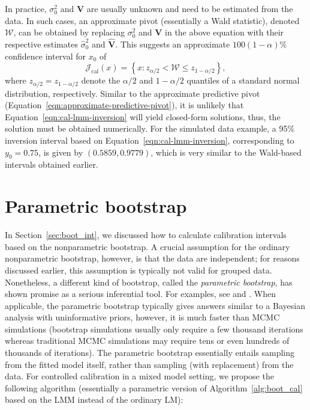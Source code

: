 \documentclass[cmfont,usenames,dvipsnames,leqno]{afit-etd}\usepackage[]{graphicx}\usepackage[]{color}
\newcommand{\mc}[1]{\ensuremath{\mathcal{#1}}}
\newcommand{\wh}[1]{\ensuremath{\widehat{#1}}}
\begin{document}
In practice, $\sigma_0^2$ and $\bm{V}$ are usually unknown and need to be estimated from the data. In such cases, an approximate pivot (essentially a Wald statistic), denoted $\mc{W}$, can be obtained by replacing $\sigma_0^2$ and $\bm{V}$ in the above equation with their respective estimates $\wh{\sigma}_0^2$ and $\wh{\bm{V}}$. This suggests an approximate $100(1-\alpha)\%$ confidence interval for $x_0$ of
\begin{equation}
\label{eqn:cal-lmm-inversion}
  \mc{J}_\mathrm{cal}(x) = \left\{ x: z_{\alpha/2} < \mc{W} \le z_{1-\alpha/2} \right\},
\end{equation}
where $z_{\alpha/2} = z_{1-\alpha/2}$ denote the $\alpha/2$ and $1 - \alpha/2$ quantiles of a standard normal distribution, respectively. Similar to the approximate predictive pivot (Equation~\eqref{eqn:approximate-predictive-pivot}), it is unlikely that Equation~\eqref{eqn:cal-lmm-inversion} will yield closed-form solutions, thus, the solution must be obtained numerically. For the simulated data example, a 95\% inversion interval based on Equation~\eqref{eqn:cal-lmm-inversion}, corresponding to $y_0 = 0.75$, is given by $(0.5859, 0.9779)$, which is very similar to the Wald-based intervals obtained earlier.

\section{Parametric bootstrap}
\label{sec:calibration-lmm-parboot}
In Section~\ref{sec:boot_int}, we discussed how to calculate calibration intervals based on the nonparametric bootstrap. A crucial assumption for the ordinary nonparametric bootstrap, however, is that the data are independent; for reasons discussed earlier, this assumption is typically not valid for grouped data. Nonetheless, a different kind of bootstrap, called the \textit{parametric bootstrap}, has shown promise as a serious inferential tool. For examples, see \citet[pg. 342]{mcculloch_generalized_2008} and \citet{efron_bootstrap_2011}. When applicable, the parametric bootstrap typically gives answers similar to a Bayesian analysis with uninformative priors, however, it is much faster than MCMC simulations (bootstrap simulations usually only require a few thousand iterations whereas traditional MCMC simulations may require tens or even hundreds of thousands of iterations). The parametric bootstrap essentially entails sampling from the fitted model itself, rather than sampling (with replacement) from the data. For controlled calibration in a mixed model setting, we propose the following algorithm (essentially a parametric version of Algorithm~\ref{alg:boot_cal} based on the LMM instead of the ordinary LM):
\end{document}
